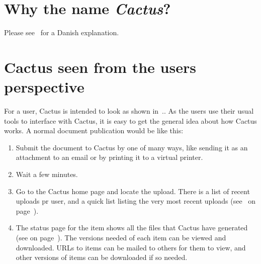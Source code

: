 \section{Why the name \textit{Cactus}?}

Please see~ for a Danish explanation.



\section{Cactus seen from the users perspective}
\label{sec:cactus-seen-from-the-users-perspective}







  For a user, Cactus is intended to look as shown
in~..  As the users use their usual tools to
interface with Cactus, it is easy to get the general idea about how
Cactus works. A normal document publication would be like this:


\begin{enumerate}
\item Submit the document to Cactus by one of many ways,
  like sending it as an attachment to an email or by
  printing it to a virtual printer.

\item Wait a few minutes.

\item Go to the Cactus home page and locate the upload.  There is a
  list of recent uploads pr user, and a quick list listing the very
  most recent uploads (see~ on
  page~\pageref{fig:cactus-ten-most-recent}).

\item The status page for the item shows all the files that Cactus
  have generated (see  on
  page~\pageref{fig:cactus-splitted-email-from-lars}).  The versions
  needed of each item can be viewed and downloaded.  URLs to items can
  be mailed to others for them to view, and other versions of items
  can be downloaded if so needed.
\end{enumerate}

